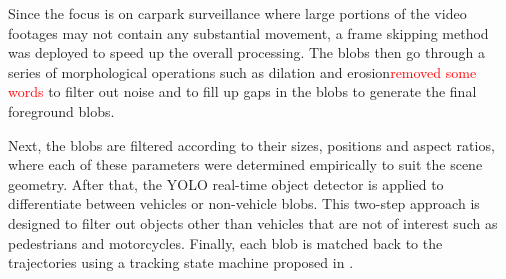 \documentclass[runningheads]{llncs}
\newcommand{\ian}[1]{\textcolor{red}{#1}}
\newcommand{\lk}[1]{\textcolor{blue}{#1}}
\newcommand{\ian}[1]{}   %
\newcommand{\lk}[1]{}   %
\begin{document}
Since the focus is on carpark surveillance where %
large portions
of the video footages may not contain any substantial movement, a frame skipping method was deployed to speed up the overall processing. The blobs then go through a series of morphological operations such as dilation and erosion\ian{removed some words} to filter out noise and to fill up gaps in the blobs to generate the final foreground blobs. 

Next, the blobs are filtered according to their sizes, positions and aspect ratios, where each of these parameters were determined empirically to suit the scene geometry. 
After that, the YOLO real-time object detector \cite{redmon2016you} is applied to differentiate between %
vehicles or non-vehicle blobs.
This two-step approach is designed to filter out objects other than vehicles that are not of interest such as pedestrians and motorcycles.  Finally, each blob %
is matched back to the trajectories using a tracking state machine proposed in \cite{lim2017}. %
\end{document}
